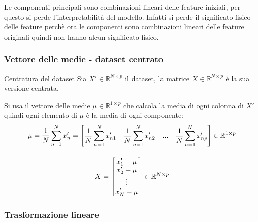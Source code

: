 	Le componenti principali sono combinazioni lineari delle feature iniziali, per questo si perde l’interpretabilità del modello. Infatti si perde il significato fisico delle feature perchè ora le componenti sono combinazioni lineari delle feature originali quindi non hanno alcun significato fisico.
	
	\subsubsection{Vettore delle medie - dataset centrato}
	
	\begin{mybox2}{Centratura del dataset}
		Sia $X'\in\mathbb{R}^{N\times p}$ il dataset, la matrice $X\in\mathbb{R}^{N\times p}$ è la sua versione centrata.\myvspace	
		
		Si usa il vettore delle medie $\mu\in\mathbb{R}^{1\times p}$ che calcola la media di ogni colonna di $X'$ quindi ogni elemento di $\mu$ è la media di ogni componente:	
		\begin{gather*}
			\mu=\frac{1}{N}\sum_{n=1}^Nx'_n=\begin{bmatrix}\displaystyle\frac{1}{N}\sum_{n=1}^Nx'_{n1}& \displaystyle \frac{1}{N}\sum_{n=1}^Nx'_{n2}& ...& \displaystyle \frac{1}{N}\sum_{n=1}^Nx'_{np} \end{bmatrix}\in\mathbb{R}^{1\times p} \sep
			X=\begin{bmatrix}
			  x'_1-\mu \\
			  x'_2-\mu \\
			  \vdots \\
			  x'_N-\mu 
			  \end{bmatrix}\in\mathbb{R}^{N\times p}
		\end{gather*}
	\end{mybox2}
	
	
	\subsubsection{Trasformazione lineare}
	
